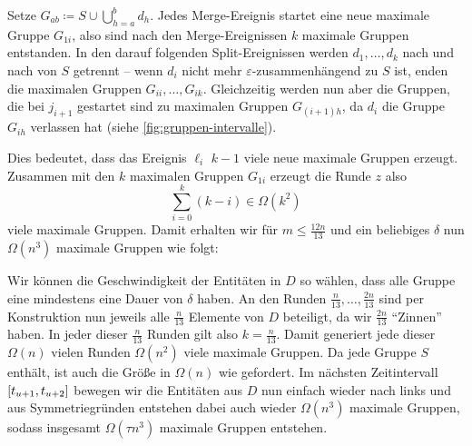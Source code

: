\begin{beweis}
	Setze $G_{ab} \coloneqq S \cup \bigcup_{h=a}^b d_h$.
	Jedes Merge-Ereignis startet eine neue maximale Gruppe $G_{1i}$, also sind nach den Merge-Ereignissen $k$ maximale Gruppen entstanden.
	In den darauf folgenden Split-Ereignissen werden $d_1, \ldots , d_k$ nach und nach von $S$ getrennt -- wenn $d_i$ nicht mehr $\varepsilon$-zusammenhängend zu $S$ ist, enden die maximalen Gruppen $G_{ii}, \ldots , G_{ik}$.
	Gleichzeitig werden nun aber die Gruppen, die bei $j_{i+1}$ gestartet sind zu maximalen Gruppen $G_{(i+1)h}$, da $d_i$ die Gruppe $G_{ih}$ verlassen hat (siehe \cref{fig:gruppen-intervalle}).
	
	Dies bedeutet, dass das Ereignis $\ell_i$ $k-1$ viele neue maximale Gruppen erzeugt.
	Zusammen mit den $k$ maximalen Gruppen $G_{1i}$ erzeugt die Runde $z$ also 
	\[
		\sum_{i=0}^{k} (k-i)  \in \Omega(k^2)
	\]
	viele maximale Gruppen.
	Damit erhalten wir für $m \le \frac{12n}{13}$ und ein beliebiges $\delta$ nun $\Omega(n^3)$ maximale Gruppen wie folgt:
	
	Wir können die Geschwindigkeit der Entitäten in $D$ so wählen, dass alle Gruppe eine mindestens eine Dauer von $\delta$ haben.
	An den Runden $\frac{n}{13}, \ldots , \frac{2n}{13}$ sind per Konstruktion nun jeweils alle $\frac{n}{13}$ Elemente von $D$ beteiligt, da wir $\frac{2n}{13}$ \enquote{Zinnen} haben.
	In jeder dieser $\frac{n}{13}$ Runden gilt also $k=\frac{n}{13}$.
	Damit generiert jede dieser $\Omega(n)$ vielen Runden $\Omega(n^2)$ viele maximale Gruppen.
	Da jede Gruppe $S$ enthält, ist auch die Größe in $\Omega(n)$ wie gefordert.
	Im nächsten Zeitintervall $\benbrace*{t_{u+1}, t_{u+2}}$ bewegen wir die Entitäten aus $D$ nun einfach wieder nach links und aus Symmetriegründen entstehen dabei auch wieder $\Omega(n^3)$ maximale Gruppen, sodass insgesamt $\Omega(\tau n^3)$ maximale Gruppen entstehen.
\end{beweis}

